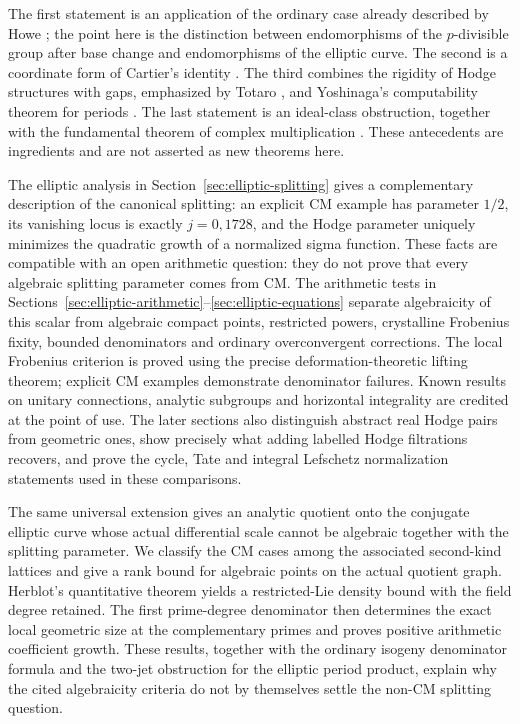 \documentclass[11pt]{article}
\theoremstyle{definition}\newtheorem{definition}[theorem]{Definition}
\theoremstyle{remark}\newtheorem{remark}[theorem]{Remark}
\begin{document}
The first statement is an application of the ordinary case already described by Howe \cite[Theorem 1.2 and Remark 1.3, p.~673]{Howe}; the point here is the distinction between endomorphisms of the $p$-divisible group after base change and endomorphisms of the elliptic curve. The second is a coordinate form of Cartier's identity \cite[Proposition 1.2.4, equation (1.2.4.5), p.~24]{Ogus}. The third combines the rigidity of Hodge structures with gaps, emphasized by Totaro \cite[pp.~1--2]{Totaro}, and Yoshinaga's computability theorem for periods \cite[Theorem 18, p.~11]{Yoshinaga}. The last statement is an ideal-class obstruction, together with the fundamental theorem of complex multiplication \cite[Theorem 3.13, pp.~23--24]{Milne}. These antecedents are ingredients and are not asserted as new theorems here.

The elliptic analysis in Section~\ref{sec:elliptic-splitting} gives a complementary description of the canonical splitting: an explicit CM example has parameter $1/2$, its vanishing locus is exactly $j=0,1728$, and the Hodge parameter uniquely minimizes the quadratic growth of a normalized sigma function. These facts are compatible with an open arithmetic question: they do not prove that every algebraic splitting parameter comes from CM. The arithmetic tests in Sections~\ref{sec:elliptic-arithmetic}--\ref{sec:elliptic-equations} separate algebraicity of this scalar from algebraic compact points, restricted powers, crystalline Frobenius fixity, bounded denominators and ordinary overconvergent corrections. The local Frobenius criterion is proved using the precise deformation-theoretic lifting theorem; explicit CM examples demonstrate denominator failures. Known results on unitary connections, analytic subgroups and horizontal integrality are credited at the point of use. The later sections also distinguish abstract real Hodge pairs from geometric ones, show precisely what adding labelled Hodge filtrations recovers, and prove the cycle, Tate and integral Lefschetz normalization statements used in these comparisons.

The same universal extension gives an analytic quotient onto the conjugate elliptic curve whose actual differential scale cannot be algebraic together with the splitting parameter. We classify the CM cases among the associated second-kind lattices and give a rank bound for algebraic points on the actual quotient graph. Herblot's quantitative theorem yields a restricted-Lie density bound with the field degree retained. The first prime-degree denominator then determines the exact local geometric size at the complementary primes and proves positive arithmetic coefficient growth. These results, together with the ordinary isogeny denominator formula and the two-jet obstruction for the elliptic period product, explain why the cited algebraicity criteria do not by themselves settle the non-CM splitting question.
\end{document}
